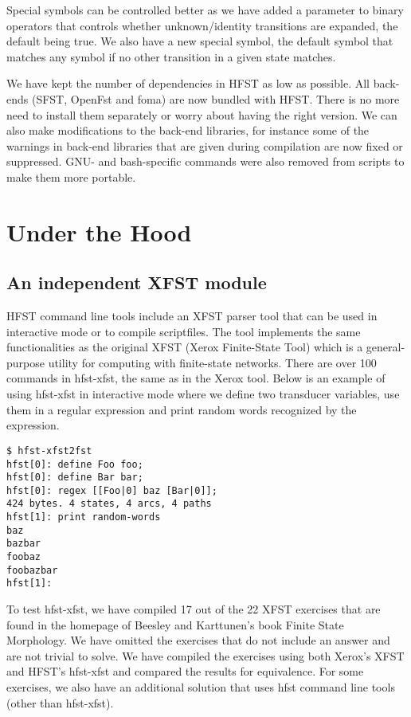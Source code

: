 \documentclass{llncs}
\begin{document}
Special symbols can be controlled better as we have added a parameter
to binary operators that controls whether unknown/identity transitions
are expanded, the default being true. We also have a new special
symbol, the default symbol that matches any symbol if no other
transition in a given state matches.

We have kept the number of dependencies in HFST as low as possible.
All back-ends (SFST, OpenFst and foma) are now bundled with
HFST. There is no more need to install them separately or worry about
having the right version. We can also make modifications to the
back-end libraries, for instance some of the warnings in back-end
libraries that are given during compilation are now fixed or
suppressed. GNU- and bash-specific commands were also removed from
scripts to make them more portable.

\section{Under the Hood}

\subsection{An independent XFST module}

HFST command line tools include an XFST parser tool that can be used
in interactive mode or to compile scriptfiles. The tool implements the
same functionalities as the original XFST (Xerox Finite-State Tool)
which is a general-purpose utility for computing with finite-state
networks. There are over 100 commands in hfst-xfst, the same as in the
Xerox tool. Below is an example of using hfst-xfst in interactive mode
where we define two transducer variables, use them in a regular
expression and print random words recognized by the expression.

\begin{verbatim}
$ hfst-xfst2fst 
hfst[0]: define Foo foo;
hfst[0]: define Bar bar;
hfst[0]: regex [[Foo|0] baz [Bar|0]];
424 bytes. 4 states, 4 arcs, 4 paths
hfst[1]: print random-words
baz
bazbar
foobaz
foobazbar
hfst[1]: 
\end{verbatim}

To test hfst-xfst, we have compiled 17 out of the 22 XFST exercises
that are found in the homepage of Beesley and Karttunen's book Finite
State Morphology. We have omitted the exercises that do not include an
answer and are not trivial to solve. We have compiled the exercises
using both Xerox's XFST and HFST's hfst-xfst and compared the results
for equivalence. For some exercises, we also have an additional
solution that uses hfst command line tools (other than hfst-xfst).
\end{document}
